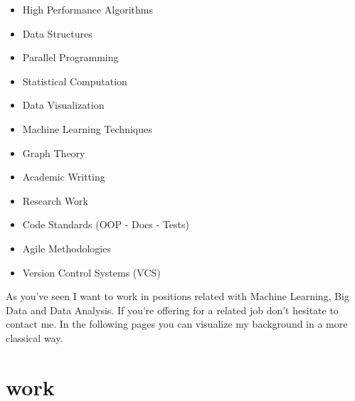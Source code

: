 \documentclass{friggeri-cv}
\newcommand{\myhref}[2]{\href[pdfnewwindow=true]{#1}{#2}}
\newcommand{\Brooktec}{\myhref{https://brooktec.com/}{Brooktec}}
\begin{document}
    \noindent
    \begin{minipage}[t]{0.5\linewidth}
      \begin{itemize}
      	\item{High Performance Algorithms}
  	    \item{Data Structures}
        \item{Parallel Programming}
        \item{Statistical Computation}
        \item{Data Visualization}
        \item{Machine Learning Techniques}
      \end{itemize}
    \end{minipage}%
    \begin{minipage}[t]{0.5\linewidth}
      \begin{itemize}
        \item{Graph Theory}
      	\item{Academic Writting}
        \item{Research Work}
        \item{Code Standards (OOP - Docs - Tests)}
        \item{Agile Methodologies}
        \item{Version Control Systems (VCS)}
      \end{itemize}
    \end{minipage}
    \par\bigskip

    As you've seen I want to work in positions related with Machine Learning, Big Data and Data Analysis. If you're offering for a related job don't hesitate to contact me. In the following pages you can visualize my background in a more classical way.


  \pagebreak


  \section{work}

\end{document}
